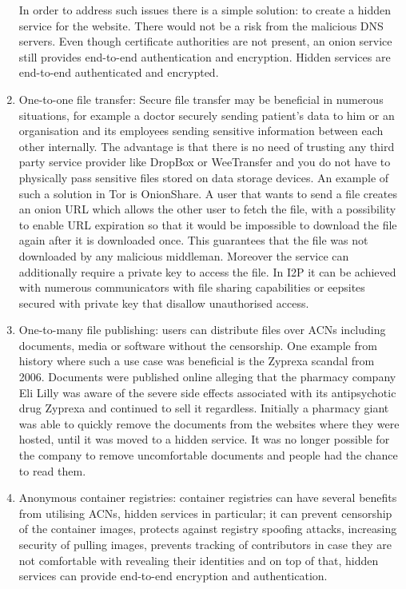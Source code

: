 \begin{enumerate}
    In order to address such issues there is a simple solution: to create a hidden service for the website. There would not be a risk from the malicious DNS servers. Even though certificate authorities are not present, an onion service still provides end-to-end authentication and encryption.
    Hidden services are end-to-end authenticated and encrypted.
    \item One-to-one file transfer: Secure file transfer may be beneficial in numerous situations, for example a doctor securely sending patient’s data to him or an organisation and its employees sending sensitive information between each other internally. The advantage is that there is no need of trusting any third party service provider like DropBox or WeeTransfer and you do not have to physically pass sensitive files stored on data storage devices.
    An example of such a solution in Tor is OnionShare. A user that wants to send a file creates an onion URL which allows the other user to fetch the file, with a possibility to enable URL expiration so that it would be impossible to download the file again after it is downloaded once. This guarantees that the file was not downloaded by any malicious middleman. Moreover the service can additionally require a private key to access the file. In I2P it can be achieved with numerous communicators with file sharing capabilities or eepsites secured with private key that disallow unauthorised access.
    \item One-to-many file publishing: users can distribute files over ACNs including documents, media or software without the censorship. One example from history where such a use case was beneficial is the Zyprexa scandal from 2006. Documents were published online alleging that the pharmacy company Eli Lilly was aware of the severe side effects associated with its antipsychotic drug Zyprexa and continued to sell it regardless. Initially a pharmacy giant was able to quickly remove the documents from the websites where they were hosted, until it was moved to a hidden service. It was no longer possible for the company to remove uncomfortable documents and people had the chance to read them.
    \item Anonymous container registries: container registries can have several benefits from utilising ACNs, hidden services in particular; it can prevent censorship of the container images, protects against registry spoofing attacks, increasing security of pulling images, prevents tracking of contributors in case they are not comfortable with revealing their identities and on top of that, hidden services can provide end-to-end encryption and authentication.

\end{enumerate}

